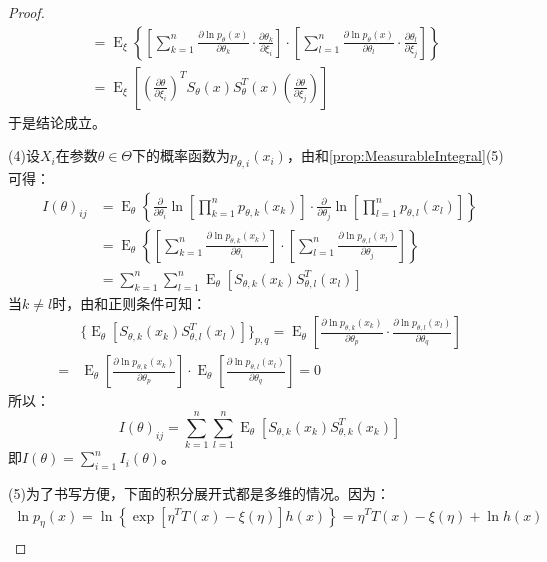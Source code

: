 \begin{proof}
\begin{align*}
		&=\operatorname{E}_{\xi}\left\{\left[\sum_{k=1}^n\frac{\partial\ln p_{\theta}(x)}{\partial\theta_k}\cdot\frac{\partial\theta_k}{\partial\xi_i}\right]\cdot\left[\sum_{l=1}^n\frac{\partial\ln p_{\theta}(x)}{\partial\theta_l}\cdot\frac{\partial\theta_l}{\partial\xi_j}\right]\right\} \\
		&=\operatorname{E}_{\xi}\left[\left(\frac{\partial\theta}{\partial\xi_i}\right)^TS_{\theta}(x)S_{\theta}^T(x)\left(\frac{\partial\theta}{\partial\xi_j}\right)\right]
	\end{align*}
	于是结论成立。\par
	(4)设$X_i$在参数$\theta\in\Theta$下的概率函数为$p_{\theta,i}(x_i)$，由和\cref{prop:MeasurableIntegral}(5)可得：
	\begin{align*}
		I(\theta)_{ij}&=\operatorname{E}_{\theta}\left\{\frac{\partial}{\partial\theta_i}\ln\left[\prod_{k=1}^{n}p_{\theta,k}(x_k)\right]\cdot\frac{\partial}{\partial\theta_j}\ln\left[\prod_{l=1}^{n}p_{\theta,l}(x_l)\right]\right\} \\
		&=\operatorname{E}_{\theta}\left\{\left[\sum_{k=1}^{n}\frac{\partial\ln p_{\theta,k}(x_k)}{\partial\theta_i}\right]\cdot\left[\sum_{l=1}^{n}\frac{\partial\ln p_{\theta,l}(x_l)}{\partial\theta_j}\right]\right\} \\
		&=\sum_{k=1}^{n}\sum_{l=1}^{n}\operatorname{E}_{\theta}[S_{\theta,k}(x_k)S_{\theta,l}^T(x_l)]
	\end{align*}
	当$k\ne l$时，由和正则条件可知：
	\begin{align*}
		&\{\operatorname{E}_{\theta}[S_{\theta,k}(x_k)S_{\theta,l}^T(x_l)]\}_{p,q}=\operatorname{E}_{\theta}\left[\frac{\partial\ln p_{\theta,k}(x_k)}{\partial\theta_p}\cdot\frac{\partial\ln p_{\theta,l}(x_l)}{\partial\theta_q}\right] \\
		=&\operatorname{E}_{\theta}\left[\frac{\partial\ln p_{\theta,k}(x_k)}{\partial\theta_p}\right]\cdot\operatorname{E}_{\theta}\left[\frac{\partial\ln p_{\theta,l}(x_l)}{\partial\theta_q}\right]=0
	\end{align*}
	所以：
	\begin{equation*}
		I(\theta)_{ij}=\sum_{k=1}^{n}\sum_{l=1}^{n}\operatorname{E}_{\theta}[S_{\theta,k}(x_k)S_{\theta,k}^T(x_k)]
	\end{equation*}
	即$I(\theta)=\sum\limits_{i=1}^{n}I_i(\theta)$。\par
	(5)为了书写方便，下面的积分展开式都是多维的情况。因为：
	\begin{gather*}
		\ln p_{\eta}(x)=\ln\left\{\exp\left[\eta^TT(x)-\xi(\eta)\right]h(x)\right\}=\eta^TT(x)-\xi(\eta)+\ln h(x) \\

\end{gather*}
\end{proof}
